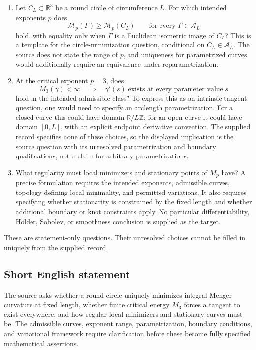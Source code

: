 \documentclass[11pt]{article}
\newcommand{\Z}{\mathbb{Z}}
\newcommand{\R}{\mathbb{R}}
\begin{document}
\begin{enumerate}
\item Let \(C_L\subset\R^3\) be a round circle of circumference \(L\). For which intended exponents \(p\) does
\[
 \mathcal M_p(\Gamma)\geq \mathcal M_p(C_L)
 \qquad\text{for every }\Gamma\in\mathcal A_L
\]
hold, with equality only when \(\Gamma\) is a Euclidean isometric image of \(C_L\)? This is a template for the circle-minimization question, conditional on \(C_L\in\mathcal A_L\). The source does not state the range of \(p\), and uniqueness for parametrized curves would additionally require an equivalence under reparametrization.
\item At the critical exponent \(p=3\), does
\[
 M_3(\gamma)<\infty
 \quad\Longrightarrow\quad
 \gamma'(s)\text{ exists at every parameter value }s
\]
hold in the intended admissible class? To express this as an intrinsic tangent question, one would need to specify an arclength parametrization. For a closed curve this could have domain \(\R/L\Z\); for an open curve it could have domain \([0,L]\), with an explicit endpoint derivative convention. The supplied record specifies none of these choices, so the displayed implication is the source question with its unresolved parametrization and boundary qualifications, not a claim for arbitrary parametrizations.
\item What regularity must local minimizers and stationary points of \(M_p\) have? A precise formulation requires the intended exponents, admissible curves, topology defining local minimality, and permitted variations. It also requires specifying whether stationarity is constrained by the fixed length and whether additional boundary or knot constraints apply. No particular differentiability, H\"older, Sobolev, or smoothness conclusion is supplied as the target.
\end{enumerate}

These are statement-only questions. Their unresolved choices cannot be filled in uniquely from the supplied record.
\subsection{Short English statement}
The source asks whether a round circle uniquely minimizes integral Menger curvature at fixed length, whether finite critical energy \(M_3\) forces a tangent to exist everywhere, and how regular local minimizers and stationary curves must be. The admissible curves, exponent range, parametrization, boundary conditions, and variational framework require clarification before these become fully specified mathematical assertions.
\end{document}
